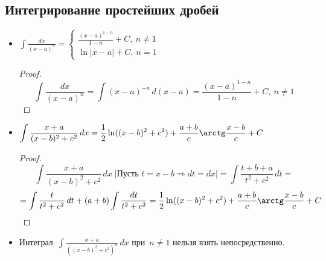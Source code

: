 \subsection{Интегрирование простейших дробей}
\begin{itemize}
	\item $\displaystyle \int \frac{dx}{(x - a)^n} =
	\begin{cases}
	\frac{(x - a)^{1-n}}{1 - n} + C, \ n \neq 1 \\
	\ln |x - a| + C, \ n = 1
	\end{cases}$
	\begin{proof}
	\begin{equation*}
	\int \frac{dx}{(x - a)^n} =
	\int (x - a)^{-n}\,d(x - a) =
	\frac{(x - a)^{1-n}}{1 - n} + C, \ n \neq 1
	\end{equation*}
	\end{proof}
	
	\item $\displaystyle \int \frac{x + a}{(x - b)^2 + c^2}\,dx =
	\frac12 \ln ((x - b)^2 + c^2) + \frac{a + b}c \arctg \frac{x - b}c + C$
	\begin{proof}
	\begin{equation*}
	\int \frac{x + a}{(x - b)^2 + c^2}\,dx \;
	\left| \text{Пусть } t = x - b \Rightarrow dt = dx \right| =
	\int \frac{t + b + a}{t^2 + c^2}\,dt =
	\end{equation*}
	\begin{equation*}
	= \int \frac{t}{t^2 + c^2}\,dt + (a + b) \int \frac{dt}{t^2 + c^2} =
	\frac12 \ln ((x - b)^2 + c^2) + \frac{a + b}c \arctg \frac{x - b}c + C
	\end{equation*}
	\end{proof}
	
	\item Интеграл~$\displaystyle \int \frac{x + a}{((x - b)^2 + c^2)^n}\,dx$ при~$n \neq 1$ нельзя взять непосредственно.
	

\end{itemize}
